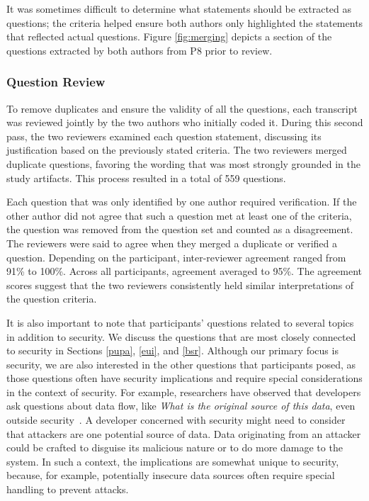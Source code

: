 \documentclass[10pt,journal,compsoc]{IEEEtran}
\begin{document}
It was sometimes difficult to determine what statements should be extracted as questions; the criteria helped ensure both authors only highlighted the statements that reflected actual questions. 
Figure \ref{fig:merging} depicts a section of the questions extracted by both authors from P8 prior to review.


\subsubsection{Question Review}
To remove duplicates and ensure the validity of all the questions, each transcript was reviewed jointly by the two authors who initially coded it.
During this second pass, the two reviewers examined each question statement, discussing its justification based on the previously stated criteria.
The two reviewers merged duplicate questions, favoring the wording that was most strongly grounded in the study artifacts.
This process resulted in a total of 559 questions.

Each question that was only identified by one author required verification.
If the other author did not agree that such a question met at least one of the criteria, the question was removed from the question set and counted as a disagreement.
The reviewers were said to agree when they merged a duplicate or verified a question. Depending on the participant, inter-reviewer agreement ranged from 91\% to 100\%. Across all participants, agreement averaged to 95\%.
The agreement scores suggest that the two reviewers consistently held similar interpretations of the question criteria.

It is also important to note that participants' questions related to several topics in addition to security. 
We discuss the questions that are most closely connected to security in Sections \ref{pupa}, \ref{eui}, and \ref{bsr}.
Although our primary focus is security, we are also interested in the other questions that participants posed, as those questions often have security implications and require special considerations in the context of security.
For example, researchers have observed that developers ask questions about data flow, like \emph{What is the original source of this data}, even outside security~\cite{latoza2010hard}.
A developer concerned with security might need to consider that attackers are one potential source of data.
Data originating from an attacker could be crafted to disguise its malicious nature or to do more damage to the system.
In such a context, the implications are somewhat unique to security, because, for example, potentially insecure data sources often require special handling to prevent attacks.
\end{document}
